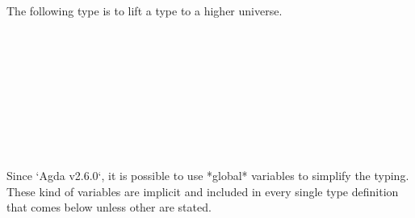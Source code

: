 \begin{code}%
\>[0]\<%
\\
\>[0][@{}l@{\AgdaIndent{0}}]%
\>[2]\AgdaSymbol{:}\AgdaSpace{}%
\AgdaSpace{}%
\AgdaSymbol{(}\AgdaSpace{}%
\AgdaSymbol{)}\<%
\\
%
\\[\AgdaEmptyExtraSkip]%
\>[0]\AgdaSpace{}%
\AgdaSymbol{=}\AgdaSpace{}%
\AgdaSpace{}%
\<%
\end{code}

The following type is to lift a type to a higher universe.

\begin{code}%
\>[0]\<%
\\
\>[0][@{}l@{\AgdaIndent{0}}]%
\>[2]%
\>[29I]\AgdaSymbol{\{}\AgdaSpace{}%
\AgdaSymbol{:}\AgdaSpace{}%
\AgdaSymbol{\}}\AgdaSpace{}%
\AgdaSpace{}%
\AgdaSymbol{(}\AgdaSpace{}%
\AgdaSymbol{:}\AgdaSpace{}%
\AgdaSpace{}%
\AgdaSymbol{)}\<%
\\
\>[.][@{}l@{}]\<[29I]%
\>[4]\AgdaSymbol{:}\AgdaSpace{}%
\AgdaSpace{}%
\AgdaSymbol{(}\AgdaSpace{}%
\AgdaSpace{}%
\AgdaSymbol{)}\<%
\\
%
\>[2]\<%
\\
%
\>[2]\AgdaSpace{}%
\<%
\\
%
\>[2]\<%
\\
\>[2][@{}l@{\AgdaIndent{0}}]%
\>[4]\AgdaSpace{}%
\AgdaSymbol{:}\AgdaSpace{}%
\<%
\\
%
\\[\AgdaEmptyExtraSkip]%
\>[0]\AgdaSpace{}%
\AgdaSpace{}%
\<%
\end{code}

Since `Agda v2.6.0`, it is possible to use *global* variables
to simplify the typing. These kind of variables are implicit and
included in every single type definition that comes below unless
other are stated.

\begin{code}%
\>[0]\<%
\\
\>[0][@{}l@{\AgdaIndent{0}}]%
\>[2]\AgdaSpace{}%
\AgdaSpace{}%
\AgdaSpace{}%
\AgdaSpace{}%
\AgdaSymbol{:}\AgdaSpace{}%
\<%
\end{code}
